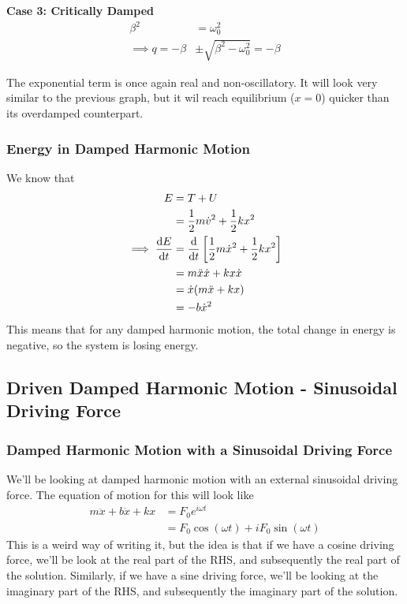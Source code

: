\documentclass[a4paper]{article}
\begin{document}
\noindent\textbf{Case 3: Critically Damped}
\begin{align*}\beta^2 &= \omega_0^2\\ \implies q = -\beta&\pm
	\sqrt{\beta^2-\omega_0^2}=-\beta
\end{align*}

The exponential term is once again real and non-oscillatory. It will look
very similar to the previous graph, but it wil reach equilibrium ($x=0$)
quicker than its overdamped counterpart.

\subsubsection{Energy in Damped Harmonic Motion}

We know that
\begin{align*}
	E&=T+U\\
	&=\frac{1}{2}m\dot{v}^2+\frac{1}{2}kx^2\\
	\implies \frac{\mathrm{d} E}{\mathrm{d} t} &=
	\frac{\mathrm{d}}{\mathrm{d} t}\left[\frac{1}{2}m\dot{x}^2+\frac{1}{2}kx^2\right]\\
	&=m\ddot{x}\dot{x}+kx\dot{x}\\
	&=\dot{x}(m\ddot{x}+kx)\\
	&=-b\dot{x}^2
\end{align*}
This means that for any damped harmonic motion, the total change in energy is
negative, so the system is losing energy.

\subsection{Driven Damped Harmonic Motion - Sinusoidal Driving Force}
\subsubsection{Damped Harmonic Motion with a Sinusoidal Driving Force}
We'll be looking at damped harmonic motion with an external sinusoidal
driving force. The equation of motion for this will look like
\begin{align*}
	m\ddot{x}+b\dot{x}+kx&=F_0e^{i\omega t}\\
			     &=F_0\cos(\omega t)+iF_0\sin(\omega t)
\end{align*}
This is a weird way of writing it, but the idea is that if we have a cosine
driving force, we'll be look at the real part of the RHS, and subsequently
the real part of the solution. Similarly, if we have a sine driving force,
we'll be looking at the imaginary part of the RHS, and subsequently the
imaginary part of the solution.
\end{document}
